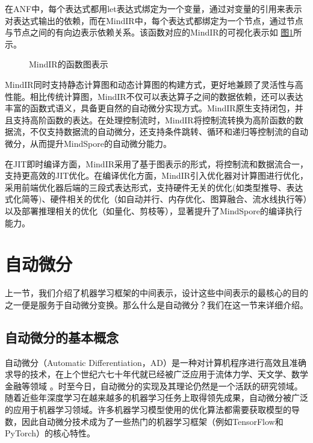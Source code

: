 \documentclass[letterpaper,10pt,english]{sphinxmanual}
\let\sphinxpxdimen\pdfpxdimen\else\newdimen\sphinxpxdimen
\begin{document}
\sphinxAtStartPar
在ANF中，每个表达式都用let表达式绑定为一个变量，通过对变量的引用来表示对表达式输出的依赖，而在MindIR中，每个表达式都绑定为一个节点，通过节点与节点之间的有向边表示依赖关系。该函数对应的MindIR的可视化表示如
\hyperref[\detokenize{chapter_frontend_and_ir/intermediate_representation:mindir-graph}]{图\ref{\detokenize{chapter_frontend_and_ir/intermediate_representation:mindir-graph}}}所示。

\begin{figure}[H]
\centering
\capstart

\noindent\sphinxincludegraphics[width=800\sphinxpxdimen]{{中间表示-MindIR图}.png}
\caption{MindIR的函数图表示}\label{\detokenize{chapter_frontend_and_ir/intermediate_representation:id19}}\label{\detokenize{chapter_frontend_and_ir/intermediate_representation:mindir-graph}}\end{figure}

\sphinxAtStartPar
MindIR同时支持静态计算图和动态计算图的构建方式，更好地兼顾了灵活性与高性能。相比传统计算图，MindIR不仅可以表达算子之间的数据依赖，还可以表达丰富的函数式语义，具备更自然的自动微分实现方式。MindIR原生支持闭包，并且支持高阶函数的表达。在处理控制流时，MindIR将控制流转换为高阶函数的数据流，不仅支持数据流的自动微分，还支持条件跳转、循环和递归等控制流的自动微分，从而提升MindSpore的自动微分能力。

\sphinxAtStartPar
在JIT即时编译方面，MindIR采用了基于图表示的形式，将控制流和数据流合一，支持更高效的JIT优化。在编译优化方面，MindIR引入优化器对计算图进行优化，采用前端\sphinxhyphen{}优化器\sphinxhyphen{}后端的三段式表达形式，支持硬件无关的优化(如类型推导、表达式化简等)、硬件相关的优化（如自动并行、内存优化、图算融合、流水线执行等）以及部署推理相关的优化（如量化、剪枝等），显著提升了MindSpore的编译执行能力。


\section{自动微分}
\label{\detokenize{chapter_frontend_and_ir/ad:id1}}\label{\detokenize{chapter_frontend_and_ir/ad::doc}}
\sphinxAtStartPar
上一节，我们介绍了机器学习框架的中间表示，设计这些中间表示的最核心的目的之一便是服务于自动微分变换。那么什么是自动微分？我们在这一节来详细介绍。


\subsection{自动微分的基本概念}
\label{\detokenize{chapter_frontend_and_ir/ad:id2}}
\sphinxAtStartPar
自动微分（Automatic
Differentiation，AD）是一种对计算机程序进行高效且准确求导的技术，在上个世纪六七十年代就已经被广泛应用于流体力学、天文学、数学金融等领域
。时至今日，自动微分的实现及其理论仍然是一个活跃的研究领域。随着近些年深度学习在越来越多的机器学习任务上取得领先成果，自动微分被广泛的应用于机器学习领域。许多机器学习模型使用的优化算法都需要获取模型的导数，因此自动微分技术成为了一些热门的机器学习框架（例如TensorFlow和PyTorch）的核心特性。
\end{document}
